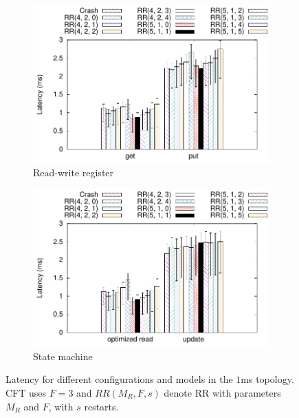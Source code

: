 \begin{figure}[t]
    \centering
    \begin{subfigure}[t]{.49 * 10cm}
        \includegraphics[width=\linewidth]{teem_results/protocol/1ms/parameter/reg_parameter}
        \caption{Read-write register}\label{fig:1ms_reg_lat_conf}
    \end{subfigure}
    \begin{subfigure}[t]{.49 * 10cm}
        \includegraphics[width=\linewidth]{teem_results/protocol/1ms/parameter/smr_parameter}
        \caption{State machine}\label{fig:1ms_smr_lat_conf}
    \end{subfigure}
    \caption{Latency for
    different configurations and models in the $1$ms topology. \ac{CFT} uses
    $F=3$ and $RR(M_R, F, s)$ denote \ac{RR} with parameters $M_R$ and
    $F$, with $s$ restarts.}
\end{figure}\label{fig:protocol_parameter_lat}


